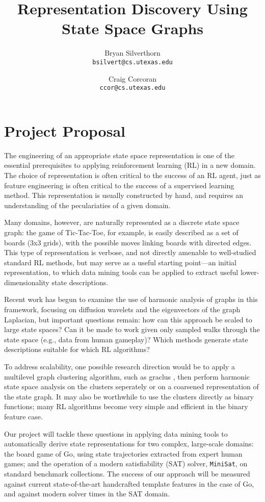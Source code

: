 \documentclass{article}
\title{Representation Discovery Using State Space Graphs}
\author{Bryan Silverthorn\\
\texttt{bsilvert@cs.utexas.edu}
\and Craig Corcoran\\
\texttt{ccor@cs.utexas.edu}}
\begin{document}
\maketitle

%
%

\section*{Project Proposal}

The engineering of an appropriate state space representation is one of the
essential prerequisites to applying reinforcement learning (RL) in a new
domain. The choice of representation is often critical to the success of an RL
agent, just as feature engineering is often critical to the success of a
supervised learning method. This representation is usually constructed by hand,
and requires an understanding of the peculariaties of a given domain.

Many domains, however, are naturally represented as a discrete state space
graph: the game of Tic-Tac-Toe, for example, is easily described as a set of
boards (3x3 grids), with the possible moves linking boards with directed edges.
This type of representation is verbose, and not directly amenable to
well-studied standard RL methods, but may serve as a useful starting point---an
initial representation, to which data mining tools can be applied to extract
useful lower-dimensionality state descriptions.

Recent work \citep{Wang2009Multiscale,Mahadevan2006Value,Coifman06Diffusion} has 
begun to examine the use of harmonic analysis of graphs in this framework, 
focusing on diffusion wavelets and the eigenvectors of the graph Laplacian, but 
important questions remain: how can this approach be scaled to large state spaces? 
Can it be made to work given only sampled walks through the state space (e.g., data 
from human gameplay)? Which methods generate state descriptions suitable for which 
RL algorithms?

To address scalability, one possible research direction would be to apply a 
multilevel graph clustering algorithm, such as graclus \citep{Dhillon07weightedgraph},
then perform harmonic state space analysis on the clusters seperately or on a 
coarsened representation of the state graph. It may also be worthwhile to use the 
clusters directly as binary functions; many RL algorithms become very simple and 
efficient in the binary feature case.  

Our project will tackle these questions in applying data mining tools to
automatically derive state representations for two complex, large-scale
domains: the board game of Go, using state trajectories extracted from expert
human games; and the operation of a modern satisfiability (SAT) solver,
\texttt{MiniSat}, on standard benchmark collections. The success of our approach 
will be measured against current state-of-the-art handcrafted template
features \citep{Silver2007Shape} in the case of Go, and against modern solver 
times in the SAT domain. 

%
%



\end{document}
